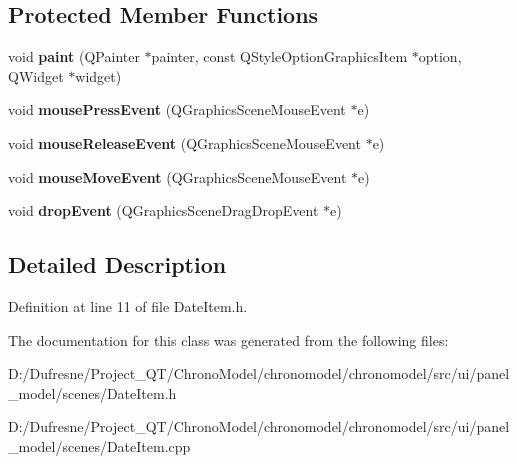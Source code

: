 \subsection*{Protected Member Functions}
\begin{DoxyCompactItemize}
\item 
\hypertarget{class_date_item_a972541a8f2bb65ec3b2574fb2deb230e}{void {\bfseries paint} (Q\-Painter $\ast$painter, const Q\-Style\-Option\-Graphics\-Item $\ast$option, Q\-Widget $\ast$widget)}\label{class_date_item_a972541a8f2bb65ec3b2574fb2deb230e}

\item 
\hypertarget{class_date_item_ad3eebcd0912acaa545fc41e8d0f5cfc4}{void {\bfseries mouse\-Press\-Event} (Q\-Graphics\-Scene\-Mouse\-Event $\ast$e)}\label{class_date_item_ad3eebcd0912acaa545fc41e8d0f5cfc4}

\item 
\hypertarget{class_date_item_ab2c27f427dd87b022163906d13ed785e}{void {\bfseries mouse\-Release\-Event} (Q\-Graphics\-Scene\-Mouse\-Event $\ast$e)}\label{class_date_item_ab2c27f427dd87b022163906d13ed785e}

\item 
\hypertarget{class_date_item_a6affb7347a7d8ab444b1df0a2ccb652b}{void {\bfseries mouse\-Move\-Event} (Q\-Graphics\-Scene\-Mouse\-Event $\ast$e)}\label{class_date_item_a6affb7347a7d8ab444b1df0a2ccb652b}

\item 
\hypertarget{class_date_item_ae7fb61f3a1e24f624eb5102b494c892f}{void {\bfseries drop\-Event} (Q\-Graphics\-Scene\-Drag\-Drop\-Event $\ast$e)}\label{class_date_item_ae7fb61f3a1e24f624eb5102b494c892f}

\end{DoxyCompactItemize}


\subsection{Detailed Description}


Definition at line 11 of file Date\-Item.\-h.



The documentation for this class was generated from the following files\-:\begin{DoxyCompactItemize}
\item 
D\-:/\-Dufresne/\-Project\-\_\-\-Q\-T/\-Chrono\-Model/chronomodel/chronomodel/src/ui/panel\-\_\-model/scenes/Date\-Item.\-h\item 
D\-:/\-Dufresne/\-Project\-\_\-\-Q\-T/\-Chrono\-Model/chronomodel/chronomodel/src/ui/panel\-\_\-model/scenes/Date\-Item.\-cpp\end{DoxyCompactItemize}
